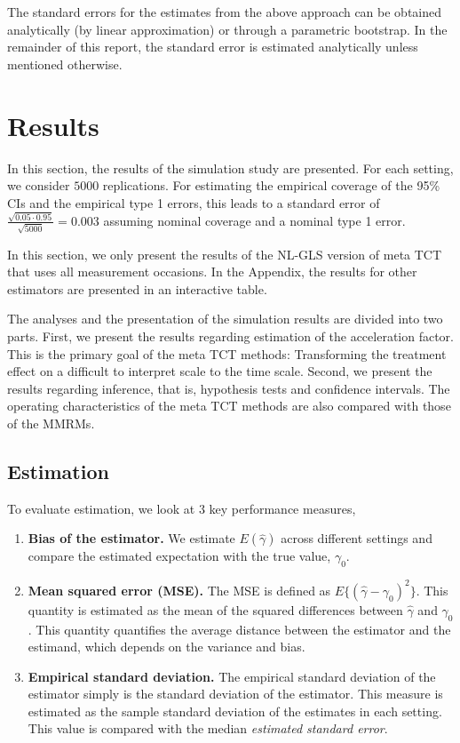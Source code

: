 \documentclass[
]{article}
\providecommand{\tightlist}{%
  \setlength{\itemsep}{0pt}\setlength{\parskip}{0pt}}
\begin{document}
The standard errors for the estimates from the above approach can be obtained
analytically (by linear approximation) or through a parametric bootstrap. In the
remainder of this report, the standard error is estimated analytically unless
mentioned otherwise.

\hypertarget{results}{%
\section{Results}\label{results}}

In this section, the results of the simulation study are presented. For each
setting, we consider \(5000\) replications. For estimating the empirical coverage
of the 95\% CIs and the empirical type 1 errors, this leads to a standard error of
\(\frac{\sqrt{0.05 \cdot 0.95}}{\sqrt{5000}} = 0.003\) assuming nominal coverage
and a nominal type 1 error.

In this section, we only present the results of the NL-GLS version of meta TCT
that uses all measurement occasions. In the Appendix, the results for other
estimators are presented in an interactive table.

The analyses and the presentation of the simulation results are divided into two
parts. First, we present the results regarding estimation of the acceleration
factor. This is the primary goal of the meta TCT methods: Transforming the
treatment effect on a difficult to interpret scale to the time scale. Second, we
present the results regarding inference, that is, hypothesis tests and
confidence intervals. The operating characteristics of the meta TCT methods are
also compared with those of the MMRMs.

\hypertarget{estimation}{%
\subsection{Estimation}\label{estimation}}

To evaluate estimation, we look at 3 key performance measures,

\begin{enumerate}
\def\labelenumi{\arabic{enumi}.}
\tightlist
\item
  \textbf{Bias of the estimator.} We estimate \(E(\hat{\gamma})\)
  across different settings and compare the estimated expectation with the
  true value, \(\gamma_0\).
\item
  \textbf{Mean squared error (MSE).} The MSE is defined as
  \(E\{(\hat{\gamma} - \gamma_0)^2 \}\). This quantity is estimated as the mean of the
  squared differences between \(\hat{\gamma}\) and \(\gamma_0\). This quantity quantifies the average
  distance between the estimator and the estimand, which depends on the variance and
  bias.
\item
  \textbf{Empirical standard deviation.} The empirical standard deviation of the estimator simply
  is the standard deviation of the estimator. This measure is estimated as the sample
  standard deviation of the estimates in each setting. This value is compared with the
  median \emph{estimated standard error}.
\end{enumerate}
\end{document}
